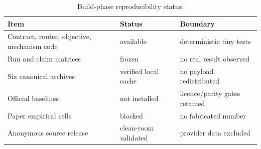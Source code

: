 \begin{table}[t]
\centering
\caption{Build-phase reproducibility status.}
\label{tab:reproducibility}
\small
\begin{tabular}{lll}
\toprule
Item & Status & Boundary \\
\midrule
Contract, router, objective, mechanism code & available & deterministic tiny tests \\
Run and claim matrices & frozen & no real result observed \\
Six canonical archives & verified local cache & no payload redistributed \\
Official baselines & not installed & licence/parity gates retained \\
Paper empirical cells & blocked & no fabricated number \\
Anonymous source release & clean-room validated & provider data excluded \\
\bottomrule
\end{tabular}
\end{table}
